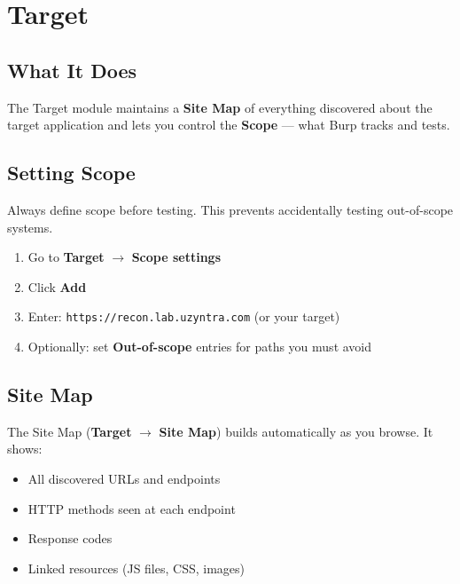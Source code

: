 
\section{Target}
\label{sec:target}

\subsection{What It Does}

The Target module maintains a \textbf{Site Map} of everything discovered about the target application and lets you control the \textbf{Scope} — what Burp tracks and tests.

\subsection{Setting Scope}

Always define scope before testing. This prevents accidentally testing out-of-scope systems.

\begin{enumerate}
  \item Go to \textbf{Target} $\to$ \textbf{Scope settings}
  \item Click \textbf{Add}
  \item Enter: \texttt{https://recon.lab.uzyntra.com} (or your target)
  \item Optionally: set \textbf{Out-of-scope} entries for paths you must avoid
\end{enumerate}


\subsection{Site Map}

The Site Map (\textbf{Target} $\to$ \textbf{Site Map}) builds automatically as you browse. It shows:
\begin{itemize}
  \item All discovered URLs and endpoints
  \item HTTP methods seen at each endpoint
  \item Response codes
  \item Linked resources (JS files, CSS, images)
\end{itemize}


